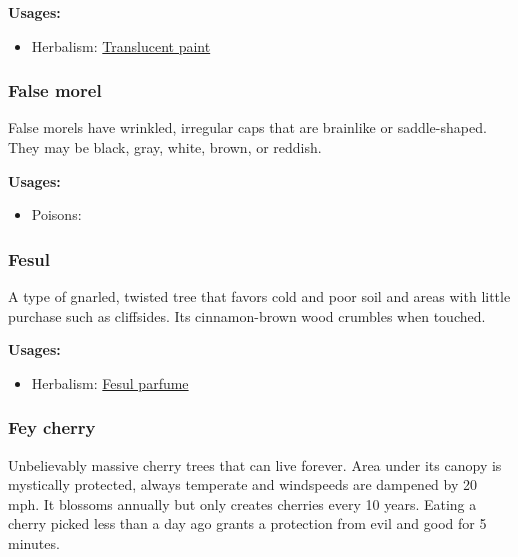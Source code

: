 \textbf{Usages:}

\begin{itemize}[noitemsep]
\item[] Herbalism: \hyperref[Translucent paint]{Translucent paint}
\end{itemize}

\subsubsection{False morel}
\label{False morel}

False morels have wrinkled, irregular caps that are brainlike or saddle-shaped. They may be black, gray, white, brown, or reddish.

\vspace{5mm}

\textbf{Usages:}

\begin{itemize}[noitemsep]
\item[] Poisons: \poison
\end{itemize}


\subsubsection{Fesul}
\label{Fesul}

A type of gnarled, twisted tree that favors cold and poor soil and areas with little purchase such as cliffsides. Its cinnamon-brown wood crumbles when touched.

\vspace{5mm}

\textbf{Usages:}

\begin{itemize}[noitemsep]
\item[] Herbalism: \hyperref[Fesul parfume]{Fesul parfume}
\end{itemize}

\subsubsection{Fey cherry}
\label{Fey cherry}

Unbelievably massive cherry trees that can live forever. Area under its canopy is mystically protected, always temperate and windspeeds are dampened by 20 mph. It blossoms annually but only creates cherries every 10 years. Eating a cherry picked less than a day ago grants a protection from evil and good for 5 minutes.

\vspace{5mm}

